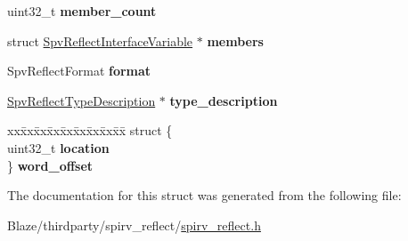 \begin{DoxyCompactItemize}
\item 
\mbox{\label{structSpvReflectInterfaceVariable_a38c9ad896ade12dee24ecb61f8386f8c}} 
uint32\+\_\+t {\bfseries member\+\_\+count}
\item 
\mbox{\label{structSpvReflectInterfaceVariable_ac582f5925d39a730e1d3dfe8248e18d1}} 
struct \hyperlink{structSpvReflectInterfaceVariable}{Spv\+Reflect\+Interface\+Variable} $\ast$ {\bfseries members}
\item 
\mbox{\label{structSpvReflectInterfaceVariable_ac328ceeb1a0ad6fe5170359ffca4cb6c}} 
Spv\+Reflect\+Format {\bfseries format}
\item 
\mbox{\label{structSpvReflectInterfaceVariable_ac015db40f2387a688cc310127d2898d2}} 
\hyperlink{structSpvReflectTypeDescription}{Spv\+Reflect\+Type\+Description} $\ast$ {\bfseries type\+\_\+description}
\item 
\mbox{\label{structSpvReflectInterfaceVariable_a14910049677c7644e3865d813b825f4f}} 
\begin{tabbing}
xx\=xx\=xx\=xx\=xx\=xx\=xx\=xx\=xx\=\kill
struct \{\\
\>uint32\_t {\bfseries location}\\
\} {\bfseries word\_offset}\\

\end{tabbing}\end{DoxyCompactItemize}


The documentation for this struct was generated from the following file\+:\begin{DoxyCompactItemize}
\item 
Blaze/thirdparty/spirv\+\_\+reflect/\hyperlink{spirv__reflect_8h}{spirv\+\_\+reflect.\+h}\end{DoxyCompactItemize}
